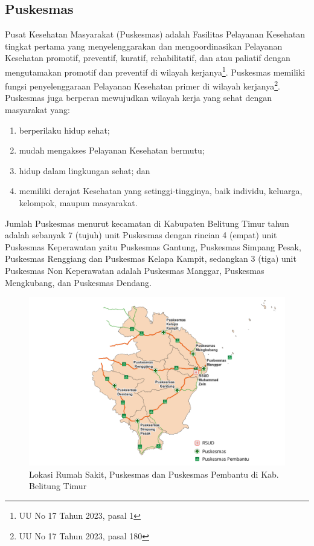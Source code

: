 \subsection{Puskesmas}
Pusat Kesehatan Masyarakat (Puskesmas) adalah Fasilitas Pelayanan Kesehatan tingkat pertama yang menyelenggarakan dan mengoordinasikan
Pelayanan Kesehatan promotif, preventif, kuratif, rehabilitatif, dan atau paliatif dengan mengutamakan promotif dan preventif di wilayah kerjanya\footnote{UU No 17 Tahun 2023, pasal 1}. Puskesmas memiliki fungsi penyelenggaraan Pelayanan Kesehatan primer di wilayah kerjanya\footnote{UU No 17 Tahun 2023, pasal 180}. Puskesmas juga berperan mewujudkan wilayah kerja yang sehat dengan masyarakat yang:
\begin{enumerate}[label=\alph*]
	\item berperilaku hidup sehat;
	\item mudah mengakses Pelayanan Kesehatan bermutu;
	\item hidup dalam lingkungan sehat; dan
	\item memiliki derajat Kesehatan yang setinggi-tingginya, baik individu, keluarga, kelompok, maupun masyarakat.
\end{enumerate}

Jumlah Puskesmas menurut kecamatan di Kabupaten Belitung Timur tahun \tP adalah sebanyak 7 (tujuh) unit Puskesmas dengan rincian 4 (empat) unit Puskesmas Keperawatan yaitu Puskesmas Gantung, Puskesmas Simpang Pesak, Puskesmas Renggiang dan Puskesmas Kelapa Kampit, sedangkan 3 (tiga) unit Puskesmas Non Keperawatan adalah Puskesmas Manggar, Puskesmas Mengkubang, dan Puskesmas Dendang.

\begin{figure}[H]
	\centering
	\includegraphics[width=\textwidth]{bab_02/bab_02_01_petaFaskes}	
	\caption{Lokasi Rumah Sakit, Puskesmas dan Puskesmas Pembantu di Kab. Belitung Timur}
	\label{fig:peta-puskesmas-rs}
\end{figure}

